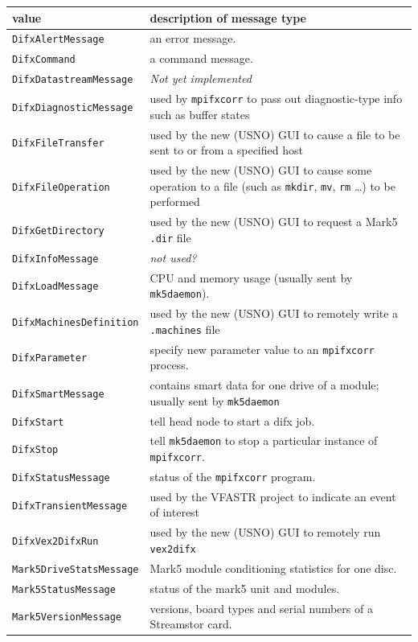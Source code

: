 \begin{description}
\begin{tabular}{ll}
value    & description of message type \\
\hline
{\tt DifxAlertMessage} & an error message. \\
{\tt DifxCommand} & a command message. \\
{\tt DifxDatastreamMessage} & {\em Not yet implemented} \\
{\tt DifxDiagnosticMessage} & used by {\tt mpifxcorr} to pass out diagnostic-type info such as buffer states \\
{\tt DifxFileTransfer} & used by the new (USNO) GUI to cause a file to be sent to or from a specified host \\
{\tt DifxFileOperation} & used by the new (USNO) GUI to cause some operation to a file (such as {\tt mkdir}, {\tt mv}, {\tt rm} \dots) to be performed \\
{\tt DifxGetDirectory} & used by the new (USNO) GUI to request a Mark5 {\tt .dir} file \\
{\tt DifxInfoMessage} & {\em not used?} \\
{\tt DifxLoadMessage} & CPU and memory usage (usually sent by {\tt mk5daemon}). \\
{\tt DifxMachinesDefinition} & used by the new (USNO) GUI to remotely write a {\tt .machines} file \\
{\tt DifxParameter} & specify new parameter value to an {\tt mpifxcorr} process. \\
{\tt DifxSmartMessage} & contains smart data for one drive of a module; usually sent by {\tt mk5daemon} \\
{\tt DifxStart} & tell head node to start a difx job. \\
{\tt DifxStop} & tell {\tt mk5daemon} to stop a particular instance of {\tt mpifxcorr}. \\
{\tt DifxStatusMessage} & status of the {\tt mpifxcorr} program. \\
{\tt DifxTransientMessage} & used by the VFASTR project to indicate an event of interest \\
{\tt DifxVex2DifxRun} & used by the new (USNO) GUI to remotely run {\tt vex2difx} \\
{\tt Mark5DriveStatsMessage} & Mark5 module conditioning statistics for one disc. \\
{\tt Mark5StatusMessage} & status of the mark5 unit and modules. \\
{\tt Mark5VersionMessage} & versions, board types and serial numbers of a Streamstor card. 
\end{tabular}


\end{description}
